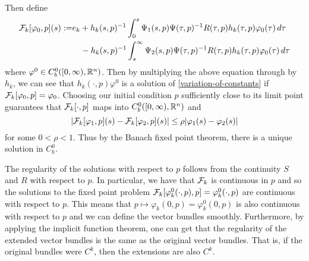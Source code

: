 Then define
\begin{equation*}
\begin{aligned}
	\mathcal{F}_k[\varphi_0, p](s) :=& e_k + h_k(s,p)^{-1}\int_0^s \Psi_1(s, p) \Psi(\tau, p)^{-1}R(\tau, p) h_k(\tau,p)\varphi_0(\tau)\, d\tau \\
	&\quad - h_k(s,p)^{-1}\int_s^\infty \Psi_2(s,p) \Psi(\tau, p)^{-1} R(\tau, p)h_k(\tau,p) \varphi_0(\tau)\, d\tau
\end{aligned}
\end{equation*}
where \(\varphi^0\in C^0_b([0,\infty), \mathbb{R}^n)\). Then by multiplying the above equation through by \(h_k\), we can see that \(h_k(\cdot, p)\varphi^0\) is a solution of \cref{variation-of-constants} if \(\mathcal{F}_k[\varphi_0, p] = \varphi_0\). Choosing our initial condition \(p\) sufficiently close to its limit point guarantees that \(\mathcal{F}_k[\cdot, p]\) maps into \(C^0_b([0,\infty), \mathbb{R}^n)\) and
\begin{equation*}
	|\mathcal{F}_k[\varphi_1, p](s) - \mathcal{F}_k[\varphi_2, p](s) | \leq \rho  |\varphi_1(s) - \varphi_2(s)| 
\end{equation*}
for some \(0< \rho < 1\). Thus by the Banach fixed point theorem, there is a unique solution in \(C^0_b\).

The regularity of the solutions with respect to \(p\) follows from the continuity \(S\) and \(R\) with respect to \(p\). In particular, we have that \(\mathcal{F}_k\) is continuous in \(p\) and so the solutions to the fixed point problem \(\mathcal{F}_k[\varphi_k^0(\cdot, p) , p] = \varphi_k^0(\cdot, p)\) are continuous with respect to \(p\). This means that \(p\mapsto \varphi_k(0,p) = \varphi_k^0(0,p) \) is also continuous with respect to \(p\) and we can define the vector bundles smoothly. Furthermore, by applying the implicit function theorem, one can get that the regularity of the extended vector bundles is the same as the original vector bundles. That is, if the original bundles were \(C^k\), then the extensions are also \(C^k\).


